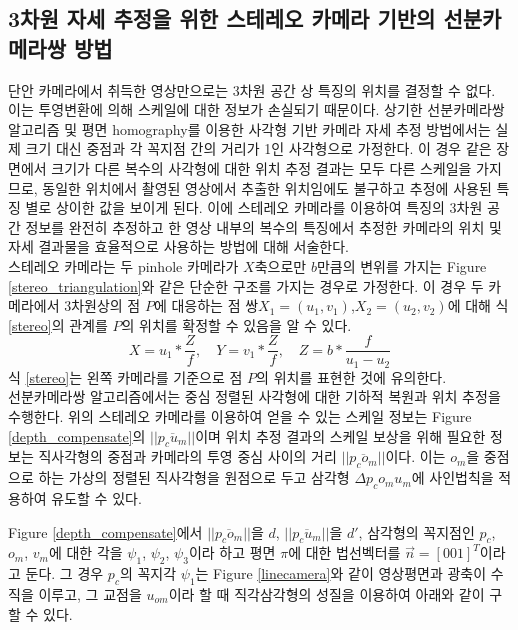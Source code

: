 \documentclass[master,korean,final]{cbnu-ecs}
\begin{document}
\newpage

\subsection{3차원 자세 추정을 위한 스테레오 카메라 기반의 선분카메라쌍 방법}
단안 카메라에서 취득한 영상만으로는 3차원 공간 상 특징의 위치를 결정할 수 없다. 이는 투영변환에 의해 스케일에 대한 정보가 손실되기 때문이다. 상기한 선분카메라쌍 알고리즘 및 평면 homography를 이용한 사각형 기반 카메라 자세 추정 방법에서는 실제 크기 대신 중점과 각 꼭지점 간의 거리가 1인 사각형으로 가정한다. 이 경우 같은 장면에서 크기가 다른 복수의 사각형에 대한 위치 추정 결과는 모두 다른 스케일을 가지므로, 동일한 위치에서 촬영된 영상에서 추출한 위치임에도 불구하고 추정에 사용된 특징 별로 상이한 값을 보이게 된다. 이에 스테레오 카메라를 이용하여 특징의 3차원 공간 정보를 완전히 추정하고 한 영상 내부의 복수의 특징에서 추정한 카메라의 위치 및 자세 결과물을 효율적으로 사용하는 방법에 대해 서술한다. \\
스테레오 카메라는 두 pinhole 카메라가 $X$축으로만 $b$만큼의 변위를 가지는 Figure \ref{stereo_triangulation}와 같은 단순한 구조를 가지는 경우로 가정한다. 이 경우 두 카메라에서 3차원상의 점 $P$에 대응하는 점 쌍$X_1=(u_1,v_1)$,$X_2=(u_2,v_2)$에 대해 식 \eqref{stereo}의 관계를 $P$의 위치를 확정할 수 있음을 알 수 있다.
\begin{equation}
\label{stereo}
X=u_1*\frac{Z}{f}, \quad Y=v_1*\frac{Z}{f}, \quad Z=b*\frac{f}{u_1-u_2}
\end{equation}
식 \eqref{stereo}는 왼쪽 카메라를 기준으로 점 $P$의 위치를 표현한 것에 유의한다.\\
선분카메라쌍 알고리즘에서는 중심 정렬된 사각형에 대한 기하적 복원과 위치 추정을 수행한다. 위의 스테레오 카메라를 이용하여 얻을 수 있는 스케일 정보는 Figure \ref{depth_compensate}의 $||\overline{p_c u_m}||$이며 위치 추정 결과의 스케일 보상을 위해 필요한 정보는 직사각형의 중점과 카메라의 투영 중심 사이의 거리 $||\overline{p_c o_m}||$이다. 이는 $o_m$을 중점으로 하는 가상의 정렬된 직사각형을 원점으로 두고 삼각형 $\Delta p_c o_m u_m$에 사인법칙을 적용하여 유도할 수 있다.

Figure \ref{depth_compensate}에서 $||\overline{p_c o_m}||$을 $d$, $||\overline{p_c u_m}||$을 $d'$, 삼각형의 꼭지점인 $p_c$, $o_m$, $v_m$에 대한 각을 $\psi_1$, $\psi_2$, $\psi_3$이라 하고 평면 $\pi$에 대한 법선벡터를 $\overrightarrow{n} = [0 0 1]^T$이라고 둔다. 그 경우 $p_c$의 꼭지각 $\psi_1$는 Figure \ref{linecamera}와 같이 영상평면과 광축이 수직을 이루고, 그 교점을 $u_{om}$이라 할 때 직각삼각형의 성질을 이용하여 아래와 같이 구할 수 있다.
\end{document}
